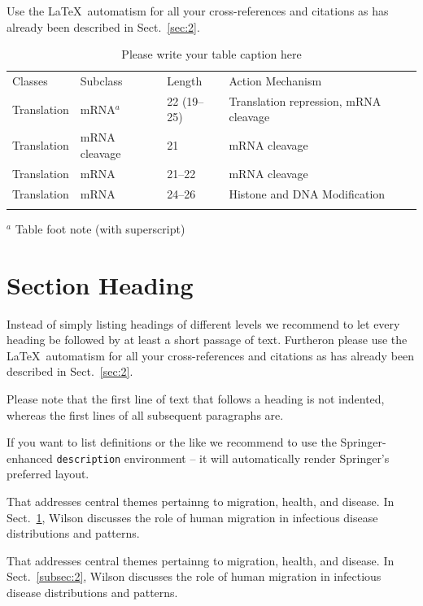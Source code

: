 \documentclass[graybox,envcountchap,sectrefs]{svmono}
\begin{document}
 Use the \LaTeX\ automatism for all your cross-refer\-ences and citations as has already been described in Sect.~\ref{sec:2}.
%
%
\begin{table}[!t]
	\caption{Please write your table caption here}
	\label{tab:1}       %
	\begin{tabular}{p{2cm}p{2.4cm}p{2cm}p{4.9cm}}
		\hline\noalign{\smallskip}
		Classes & Subclass & Length & Action Mechanism  \\
		\noalign{\smallskip}\svhline\noalign{\smallskip}
		Translation & mRNA$^a$  & 22 (19--25) & Translation repression, mRNA cleavage\\
		Translation & mRNA cleavage & 21 & mRNA cleavage\\
		Translation & mRNA  & 21--22 & mRNA cleavage\\
		Translation & mRNA  & 24--26 & Histone and DNA Modification\\
		\noalign{\smallskip}\hline\noalign{\smallskip}
	\end{tabular}
	$^a$ Table foot note (with superscript)
\end{table}
%
\section{Section Heading}\label{sec:1}
\label{sec:3}
Instead of simply listing headings of different levels we recommend to let every heading be followed by at least a short passage of text. Furtheron please use the \LaTeX\ automatism for all your cross-references and citations as has already been described in Sect.~\ref{sec:2}.

Please note that the first line of text that follows a heading is not indented, whereas the first lines of all subsequent paragraphs are.

If you want to list definitions or the like we recommend to use the Springer-enhanced \verb|description| environment -- it will automatically render Springer's preferred layout.

\begin{description}[Type 1]
	\item[Type 1]{That addresses central themes pertainng to migration, health, and disease. In Sect.~\ref{sec:1}, Wilson discusses the role of human migration in infectious disease distributions and patterns.}
	\item[Type 2]{That addresses central themes pertainng to migration, health, and disease. In Sect.~\ref{subsec:2}, Wilson discusses the role of human migration in infectious disease distributions and patterns.}
\end{description}
\end{document}
